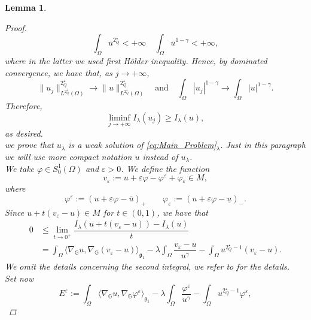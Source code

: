 \documentclass[11pt]{amsart}
\numberwithin{equation}{section} %
\newtheorem{lemma}[teo]{Lemma}
\theoremstyle{definition}
\begin{document}
\begin{lemma}
\begin{proof}
		\begin{equation*}
			\int_{\Omega}\overline{u}^{2^{\star}_{Q}}  < +\infty \quad \int_{\Omega}\overline{u}^{1-\gamma}  < +\infty,
		\end{equation*}
		\noindent where in the latter we used first H\"{o}lder inequality.
		Hence, by dominated convergence, we have that, as $j\to +\infty$,
		\begin{equation*}
			\|u_j\|^{2^{\star}_{Q}}_{L^{2^{\star}_{Q}}(\Omega)} \to \|u\|^{2^{\star}_{Q}}_{L^{2^{\star}_{Q}}(\Omega)} \quad \textrm{and} \quad \int_{\Omega}|u_j|^{1-\gamma}  \to \int_{\Omega}|u|^{1-\gamma}.
		\end{equation*}
		Therefore,
		$$\liminf_{j \to +\infty}I_{\lambda}(u_j) \geq I_{\lambda}(u),$$
		\noindent as desired.\\
		 we prove that $u_\lambda$ is a weak solution of \eqref{eq:Main_Problem}$_\lambda$. Just in this paragraph
		we will use more compact notation $u$ instead  of $u_\lambda$.\\
		\noindent We take $\varphi \in S^{1}_{0}(\Omega)$ and $\varepsilon>0$. We define the function 
		$$v_{\varepsilon}:= u + \varepsilon \varphi - \varphi^{\varepsilon} + \varphi{_\varepsilon} \in M,$$
		\noindent where 
		$$\varphi^{\varepsilon} := (u + \varepsilon \varphi - \overline{u})_{+} \qquad \varphi_{\varepsilon} := (u + \varepsilon \varphi - \underline{u})_{-}.$$
		Since $u + t(v_{\varepsilon}-u)\in M$ for $t\in (0,1)$, we have that
		\begin{equation}\label{eq:2.9Haitao}
			\begin{aligned}
				0& \leq \lim_{t \to 0^+}\dfrac{I_{\lambda}(u+t(v_{\varepsilon}-u)) - I_{\lambda}(u)}{t} \\
				&= \int_{\Omega}\langle \nabla_{\mathbb{G}}u, \nabla_{\mathbb{G}}(v_{\varepsilon}-u)\rangle_{\mathfrak{g}_{1}} - \lambda \int_{\Omega}\dfrac{v_{\varepsilon}-u}{u^{\gamma}} - \int_{\Omega}u^{2^{\star}_{Q}-1}(v_{\varepsilon}-u).
			\end{aligned}
		\end{equation}
		We omit the details concerning the second integral, we refer to \cite{Haitao} for the details.\\
		Set now
		\begin{equation*}
			E^{\varepsilon}:= \int_{\Omega} \langle \nabla_{\mathbb{G}}u, \nabla_{\mathbb{G}}\varphi^{\varepsilon}\rangle_{\mathfrak{g}_{1}} - \lambda \int_{\Omega}\dfrac{\varphi^{\varepsilon}}{u^{\gamma}}- \int_{\Omega}u^{2^{\star}_{Q}-1}\varphi^{\varepsilon},
		\end{equation*}

\end{proof}
\end{lemma}
\end{document}
